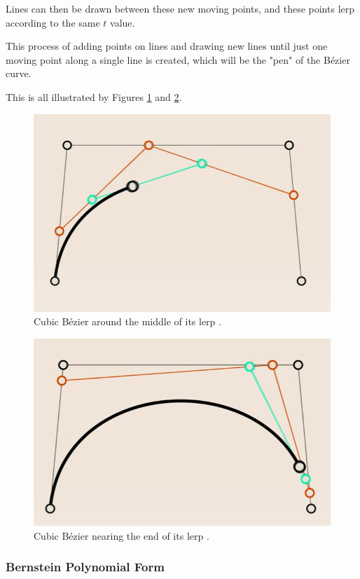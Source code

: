 \documentclass[letterpaper, 12pt]{article}
\begin{document}
Lines can then be drawn between these new moving points, and
these points lerp according to the same \(t\) value.

This process of adding points on lines and drawing new lines
until just one moving point along a single line is created, which
will be the "pen" of the Bézier curve.

This is all illustrated by Figures \ref*{fig:cubic_ill_mid} and \ref*{fig:cubic_ill_end}.

\begin{figure}[H]
    \centering
    \includegraphics[width=.8\textwidth]{cubic_ill_mid.png}
    \caption{Cubic Bézier around the middle of its lerp \protect\cite{holmerBeautyBezierCurves2021}.}
    \label{fig:cubic_ill_mid}
\end{figure}

\begin{figure}[H]
    \centering
    \includegraphics[width=.8\textwidth]{cubic_ill_end.png}
    \caption{Cubic Bézier nearing the end of its lerp \protect\cite{holmerBeautyBezierCurves2021}.}
    \label{fig:cubic_ill_end}
\end{figure}

\subsubsection{Bernstein Polynomial Form}
\end{document}
